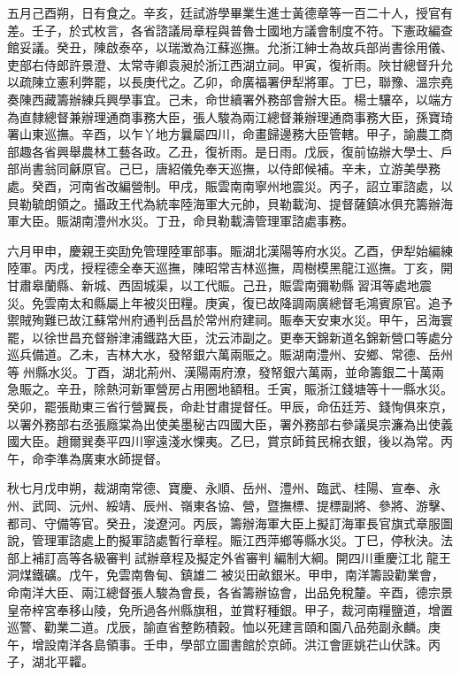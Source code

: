 \begin{pinyinscope}
五月己酉朔，日有食之。辛亥，廷試游學畢業生進士黃德章等一百二十人，授官有差。壬子，於式枚言，各省諮議局章程與普魯士國地方議會制度不符。下憲政編查館妥議。癸丑，陳啟泰卒，以瑞澂為江蘇巡撫。允浙江紳士為故兵部尚書徐用儀、吏部右侍郎許景澄、太常寺卿袁昶於浙江西湖立祠。甲寅，復祈雨。陜甘總督升允以疏陳立憲利弊罷，以長庚代之。乙卯，命廣福署伊犁將軍。丁巳，聯豫、溫宗堯奏陳西藏籌辦練兵興學事宜。己未，命世續署外務部會辦大臣。楊士驤卒，以端方為直隸總督兼辦理通商事務大臣，張人駿為兩江總督兼辦理通商事務大臣，孫寶琦署山東巡撫。辛酉，以乍丫地方曩屬四川，命畫歸邊務大臣管轄。甲子，諭農工商部趣各省興舉農林工藝各政。乙丑，復祈雨。是日雨。戊辰，復前協辦大學士、戶部尚書翁同龢原官。己巳，唐紹儀免奉天巡撫，以侍郎候補。辛未，立游美學務處。癸酉，河南省改編營制。甲戌，賑雲南南寧州地震災。丙子，詔立軍諮處，以貝勒毓朗領之。攝政王代為統率陸海軍大元帥，貝勒載洵、提督薩鎮冰俱充籌辦海軍大臣。賑湖南澧州水災。丁丑，命貝勒載濤管理軍諮處事務。

六月甲申，慶親王奕劻免管理陸軍部事。賑湖北漢陽等府水災。乙酉，伊犁始編練陸軍。丙戌，授程德全奉天巡撫，陳昭常吉林巡撫，周樹模黑龍江巡撫。丁亥，開甘肅皋蘭縣、新城、西固城渠，以工代賑。己丑，賑雲南彌勒縣習洱等處地震災。免雲南太和縣屬上年被災田糧。庚寅，復已故降調兩廣總督毛鴻賓原官。追予禦賊殉難已故江蘇常州府通判岳昌於常州府建祠。賑奉天安東水災。甲午，呂海寰罷，以徐世昌充督辦津浦鐵路大臣，沈云沛副之。更奉天錦新道名錦新營口等處分巡兵備道。乙未，吉林大水，發帑銀六萬兩賑之。賑湖南澧州、安鄉、常德、岳州等州縣水災。丁酉，湖北荊州、漢陽兩府潦，發帑銀六萬兩，並命籌銀二十萬兩急賑之。辛丑，除熱河新軍營房占用圈地額租。壬寅，賑浙江錢塘等十一縣水災。癸卯，罷張勛東三省行營翼長，命赴甘肅提督任。甲辰，命伍廷芳、錢恂俱來京，以署外務部右丞張廕棠為出使美墨秘古四國大臣，署外務部右參議吳宗濂為出使義國大臣。趙爾巽奏平四川寧遠淺水惈夷。乙巳，賞京師貧民棉衣銀，後以為常。丙午，命李準為廣東水師提督。

秋七月戊申朔，裁湖南常德、寶慶、永順、岳州、澧州、臨武、桂陽、宣奉、永州、武岡、沅州、綏靖、辰州、嶺東各協、營，暨撫標、提標副將、參將、游擊、都司、守備等官。癸丑，浚遼河。丙辰，籌辦海軍大臣上擬訂海軍長官旗式章服圖說，管理軍諮處上酌擬軍諮處暫行章程。賑江西萍鄉等縣水災。丁巳，停秋決。法部上補訂高等各級審判試辦章程及擬定外省審判編制大綱。開四川重慶江北龍王洞煤鐵礦。戊午，免雲南魯甸、鎮雄二被災田畝銀米。甲申，南洋籌設勸業會，命南洋大臣、兩江總督張人駿為會長，各省籌辦協會，出品免稅釐。辛酉，德宗景皇帝梓宮奉移山陵，免所過各州縣旗租，並賞籽種銀。甲子，裁河南糧鹽道，增置巡警、勸業二道。戊辰，諭直省整飭積穀。恤以死建言頤和園八品苑副永麟。庚午，增設南洋各島領事。壬申，學部立圖書館於京師。洪江會匪姚芢山伏誅。丙子，湖北平糶。


\end{pinyinscope}
